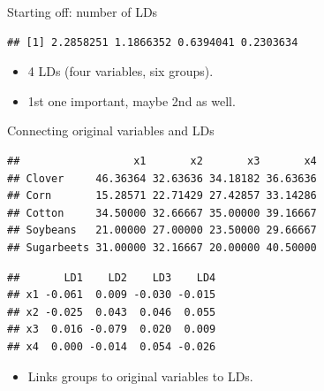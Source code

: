 \begin{frame}[fragile]{Starting off: number of LDs}
  
\begin{knitrout}
\color{fgcolor}\begin{kframe}
\begin{alltt}
\hlkwb{=}\hlstd{(}\hlstd{,}
\hlkwb{=}\hlopt{~}\hlopt{+}\hlopt{+}\hlopt{+}
\hlopt{$}
\end{alltt}
\begin{verbatim}
## [1] 2.2858251 1.1866352 0.6394041 0.2303634
\end{verbatim}
\end{kframe}
\end{knitrout}

\begin{itemize}
\item 4 LDs (four variables, six groups).
\item 1st one important, maybe 2nd as well.
\end{itemize}
  
\end{frame}


\begin{frame}[fragile]{Connecting original variables and LDs}
  
\begin{knitrout}
\color{fgcolor}\begin{kframe}
\begin{alltt}
\hlopt{$}
\end{alltt}
\begin{verbatim}
##                  x1       x2       x3       x4
## Clover     46.36364 32.63636 34.18182 36.63636
## Corn       15.28571 22.71429 27.42857 33.14286
## Cotton     34.50000 32.66667 35.00000 39.16667
## Soybeans   21.00000 27.00000 23.50000 29.66667
## Sugarbeets 31.00000 32.16667 20.00000 40.50000
\end{verbatim}
\begin{alltt}
\hlopt{$}\hlstd{)}
\end{alltt}
\begin{verbatim}
##       LD1    LD2    LD3    LD4
## x1 -0.061  0.009 -0.030 -0.015
## x2 -0.025  0.043  0.046  0.055
## x3  0.016 -0.079  0.020  0.009
## x4  0.000 -0.014  0.054 -0.026
\end{verbatim}
\end{kframe}
\end{knitrout}

\begin{itemize}
\item Links groups to original variables to LDs.
\end{itemize}
\end{frame}


